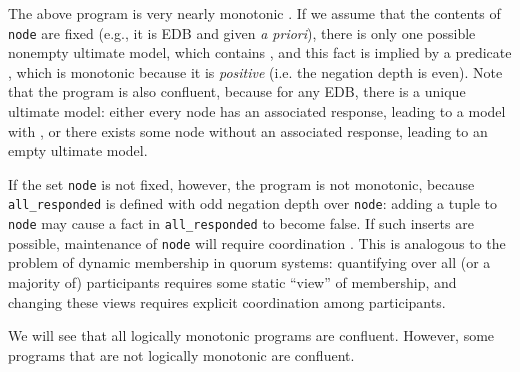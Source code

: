 The above program is very nearly monotonic . If we assume that the contents of \texttt{node}
are fixed (e.g., it is EDB and given \emph{a priori}), there is only one possible nonempty ultimate model, which contains , and this fact is implied by a predicate , which is monotonic because it is {\em positive} (i.e. the negation depth is even). 
Note that the program is also confluent, because for any EDB, there is a unique ultimate model: either every node has an associated response, leading to a model with , or there exists some node without an associated response, leading to an empty ultimate model.

If the set \texttt{node} is not fixed, however, the program is not monotonic, because 
\texttt{all\_responded} is defined with odd negation depth over \texttt{node}: adding a tuple
to \texttt{node} may cause a fact in \texttt{all\_responded} to become false.  If such inserts
are possible, maintenance of \texttt{node} will require coordination .  This is analogous to
the problem of dynamic membership in quorum systems: quantifying over all (or a majority
of) participants requires some static ``view'' of membership, and changing these views requires
explicit coordination among participants.

We will see that all logically monotonic programs are confluent.  However, some programs that are not logically monotonic are confluent.

